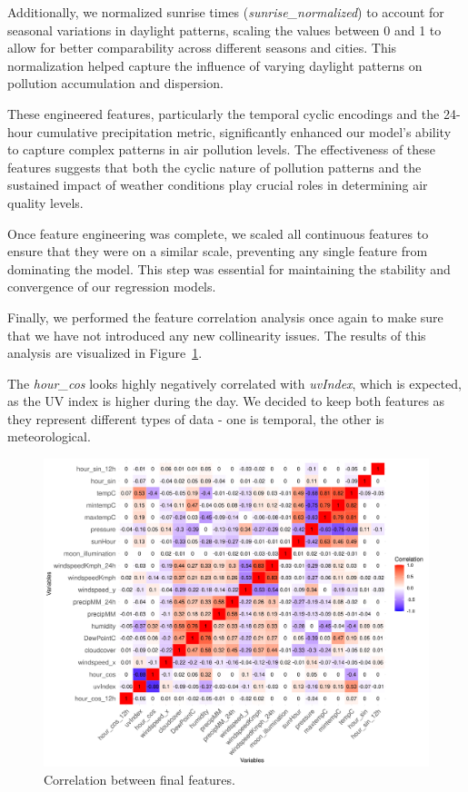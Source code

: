 \documentclass[twoside,11pt]{article}
\begin{document}
Additionally, we normalized sunrise times (\textit{sunrise\_normalized}) to account for seasonal variations in daylight patterns, scaling the values between 0 and 1 to allow for better comparability across different seasons and cities. This normalization helped capture the influence of varying daylight patterns on pollution accumulation and dispersion.

These engineered features, particularly the temporal cyclic encodings and the 24-hour cumulative precipitation metric, significantly enhanced our model's ability to capture complex patterns in air pollution levels. The effectiveness of these features suggests that both the cyclic nature of pollution patterns and the sustained impact of weather conditions play crucial roles in determining air quality levels.

Once feature engineering was complete, we scaled all continuous features to ensure that they were on a similar scale, preventing any single feature from dominating the model. This step was essential for maintaining the stability and convergence of our regression models.

Finally, we performed the feature correlation analysis once again to make sure that we have not introduced any new collinearity issues. The results of this analysis are visualized in Figure~\ref{fig:final_feature_correlation}.

The \textit{hour\_cos} looks highly negatively correlated with \textit{uvIndex}, which is expected, as the UV index is higher during the day. We decided to keep both features as they represent different types of data - one is temporal, the other is meteorological.

\begin{figure}[H]
  \centering
  \includegraphics[width=\textwidth]{assets/feature-correlation-matrix-final.png}
  \caption{Correlation between final features.}
  \label{fig:final_feature_correlation}
\end{figure}
\end{document}
